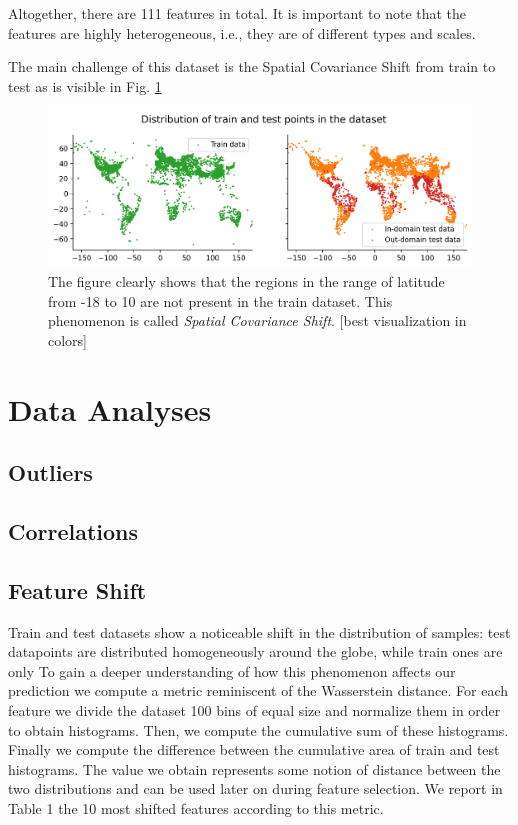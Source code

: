 \documentclass[letterpaper, 10 pt, conference]{ieeeconf}
\begin{document}
    Altogether, there are 111 features in total. It is important to note that the features are highly heterogeneous, i.e., they are of different types and scales.

    The main challenge of this dataset is the Spatial Covariance Shift from train to test as is visible in Fig. \ref{fig:train-test-diff}

    \begin{figure}
        \centering
        \includegraphics[width=\linewidth]{assets/train-test-diff.png}
        \caption{The figure clearly shows that the regions in the range of latitude from -18 to 10 are not present in the train dataset. This phenomenon is called \textit{Spatial Covariance Shift}. [best visualization in colors] }
        \label{fig:train-test-diff}
    \end{figure}

    \section{Data Analyses}
    
    \subsection{Outliers}
    \subsection{Correlations}
    \subsection{Feature Shift}
    Train and test datasets show a noticeable shift in the distribution of samples: test datapoints are distributed homogeneously around the globe, while train ones are only 
    To gain a deeper understanding of how this phenomenon affects our prediction we compute a metric reminiscent of the Wasserstein distance. For each feature we divide the dataset 100 bins of equal size and normalize them in order to obtain histograms. Then, we compute the cumulative sum of these histograms. Finally we compute the difference between the cumulative area of train and test histograms. The value we obtain represents some notion of distance between the two distributions and can be used later on during feature selection. We report in Table 1 the 10 most shifted features according to this metric. 
    
\end{document}
